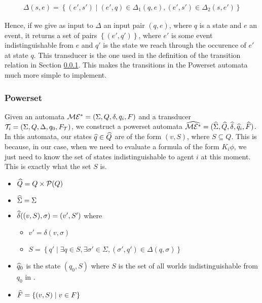 \documentclass[12pt, a4paper]{article}
\begin{document}
\begin{align*}
  \Delta(s, e) = \left\{ (e', s') \mid (e', q) \in \Delta_1(q, e), (e', s') \in \Delta_2(s, e') \right\} 
\end{align*}

Hence, if we give as input to $\Delta$ an input pair $(q, e)$, where $q$ is a
state and $e$ an event, it returns a set of pairs $\left\{ (e', q') \right\}$,
where $e'$ is some event indistinguishable from $e$ and $q'$ is the state we
reach through the occurence of $e'$ at state $q$. This transducer is the one
used in the definition of the transition relation in Section
\ref{subsubsec:Powerset}. This makes the transitions in the Powerset automata
much more simple to implement. 

\subsubsection{Powerset}
\label{subsubsec:Powerset}

Given an automata $\mathcal{ME^\ast} = (\Sigma, Q, \delta, q_i, F)$ and a transducer
$\mathcal{T}_i = (\Sigma, Q, \Delta, q_0, F_{\mathcal{T}})$, we construct a
powerset automata $\widehat{\mathcal{ME^\ast}} = (\widehat{\Sigma}, \widehat{Q}, \widehat{\delta}, \widehat{q}_i,
\widehat{F})$. In this automata, our states $\widehat{q} \in \widehat{Q}$ are of the form $(v,
S)$, where $S \subseteq Q$. This is because, in our case, when we need to
evaluate a formula of the form $K_i\phi$, we just need to know the set of states
indistinguishable to agent $i$ at this moment. This is exactly what the set $S$
is.

\begin{itemize}
\item $\widehat{Q} = Q \times \mathcal{P}(Q)$
\item $\widehat{\Sigma} = \Sigma$ 
\item $\widehat{\delta}((v, S), \sigma) = (v', S')$ where
  \begin{itemize}
  \item $v' =  \delta(v, \sigma)$
  \item $S = \left\{q' \mid \exists q \in S, \exists \sigma' \in \Sigma,
      (\sigma', q') \in \Delta(q, \sigma) \right\}$
  \end{itemize}
\item $\widehat{q}_0$ is the state $(q_0, S)$ where $S$ is the set of all worlds
  indistinguishable from $q_0$ in \mestar.
\item $\widehat{F} = \left\{ (v, S) \mid v \in F \right\}$
\end{itemize}
\end{document}
